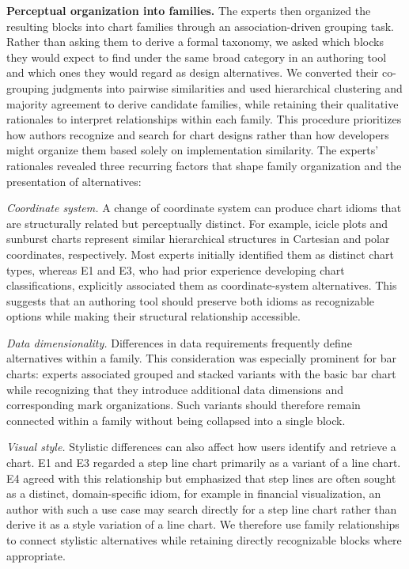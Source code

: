 \textbf{Perceptual organization into families.}
The experts then organized the resulting blocks into chart families through
an association-driven grouping task. Rather than asking them to derive a
formal taxonomy, we asked which blocks they would expect to find under the
same broad category in an authoring tool and which ones they would regard as
design alternatives. We converted their co-grouping judgments into pairwise
similarities and used hierarchical clustering and majority agreement to
derive candidate families, while retaining their qualitative rationales to
interpret relationships within each family. This procedure prioritizes how
authors recognize and search for chart designs rather than how developers
might organize them based solely on implementation similarity.
The experts' rationales revealed three recurring factors that shape family
organization and the presentation of alternatives:

\emph{Coordinate system.}
A change of coordinate system can produce chart idioms that are structurally
related but perceptually distinct. For example, icicle plots and sunburst
charts represent similar hierarchical structures in Cartesian and polar
coordinates, respectively. Most experts initially identified them as distinct
chart types, whereas E1 and E3, who had prior experience developing chart
classifications, explicitly associated them as coordinate-system alternatives.
This suggests that an authoring tool should preserve both idioms as
recognizable options while making their structural relationship accessible.

\emph{Data dimensionality.}
Differences in data requirements frequently define alternatives within a
family. This consideration was especially prominent for bar charts: experts
associated grouped and stacked variants with the basic bar chart while
recognizing that they introduce additional data dimensions and corresponding
mark organizations. Such variants should therefore remain connected within a
family without being collapsed into a single block.

\emph{Visual style.}
Stylistic differences can also affect how users identify and retrieve a chart.
E1 and E3 regarded a step line chart primarily as a variant of a line chart.
E4 agreed with this relationship but emphasized that step lines are often
sought as a distinct, domain-specific idiom, for example in financial
visualization, an author with such a use case may search directly for a step
line chart rather than derive it as a style variation of a line chart. We
therefore use family relationships to connect stylistic alternatives while
retaining directly recognizable blocks where appropriate.


